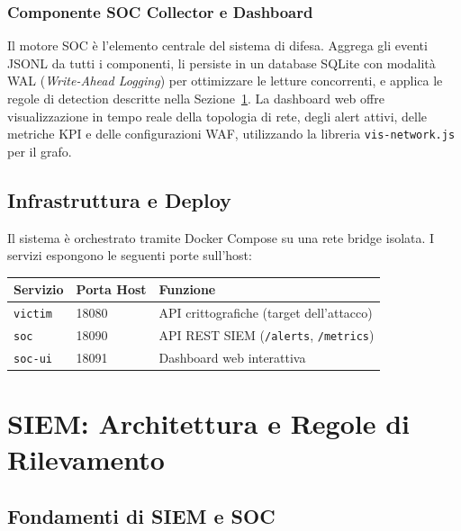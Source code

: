 \documentclass[12pt,a4paper]{article}
\begin{document}
\subsubsection{Componente SOC Collector e Dashboard}

Il motore SOC è l'elemento centrale del sistema di difesa. Aggrega gli eventi JSONL
da tutti i componenti, li persiste in un database SQLite con modalità WAL
(\emph{Write-Ahead Logging}) per ottimizzare le letture concorrenti, e applica le regole
di detection descritte nella Sezione~\ref{sec:siem}. La dashboard web offre visualizzazione
in tempo reale della topologia di rete, degli alert attivi, delle metriche KPI e delle
configurazioni WAF, utilizzando la libreria \texttt{vis-network.js} per il grafo.

\subsection{Infrastruttura e Deploy}

Il sistema è orchestrato tramite Docker Compose su una rete bridge isolata. I servizi
espongono le seguenti porte sull'host:

\begin{center}
\begin{tabular}{lll}
\toprule
\textbf{Servizio} & \textbf{Porta Host} & \textbf{Funzione} \\
\midrule
\texttt{victim}    & 18080 & API crittografiche (target dell'attacco) \\
\texttt{soc}       & 18090 & API REST SIEM (\texttt{/alerts}, \texttt{/metrics}) \\
\texttt{soc-ui}    & 18091 & Dashboard web interattiva \\
\bottomrule
\end{tabular}
\end{center}

\section{SIEM: Architettura e Regole di Rilevamento}
\label{sec:siem}

\subsection{Fondamenti di SIEM e SOC}
\end{document}
